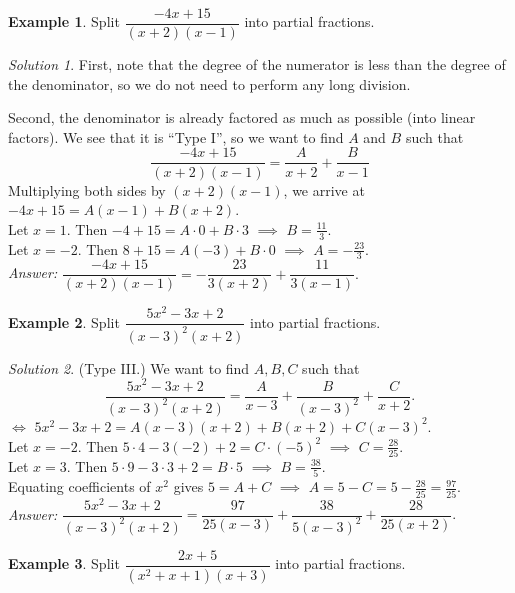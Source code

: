 \documentclass[
  english,
  12pt,
  oneside]{book}
\theoremstyle{definition}
\theoremstyle{definition}
\newtheorem{example}{Example}[chapter]
\theoremstyle{definition}
\theoremstyle{definition}
\theoremstyle{remark}
\newtheorem*{solution}{Solution}
\begin{document}
\begin{example}
Split \(\dfrac{-4x+15}{(x+2)(x-1)}\) into partial fractions.
\end{example}

\begin{solution}
First, note that the degree of the numerator is less than the degree of the denominator, so we do not need to perform any long division.

Second, the denominator is already factored as much as possible (into linear factors). We see that it is ``Type I'', so we want to find \(A\) and \(B\) such that
\[\frac{-4x+15}{(x+2)(x-1)} = \frac{A}{x+2}+\frac{B}{x-1}\]
Multiplying both sides by \((x+2)(x-1)\), we arrive at\\
\(-4x+15 = A(x-1)+B(x+2)\).\\
Let \(x=1\). Then \(-4+15 = A\cdot 0+B\cdot 3\) \(\implies\) \(B=\frac{11}{3}\).\\
Let \(x=-2\). Then \(8+15=A(-3)+B\cdot 0\) \(\implies\) \(A=-\frac{23}{3}\).\\
\emph{Answer:}
\(\dfrac{-4x+15}{(x+2)(x-1)} = -\dfrac{23}{3(x+2)}+\dfrac{11}{3(x-1)}.\)
\end{solution}

\begin{example}
Split \(\dfrac{5x^2-3x+2}{(x-3)^2(x+2)}\) into partial fractions.
\end{example}

\begin{solution}
(Type III.) We want to find \(A,B,C\) such that
\[\frac{5x^2-3x+2}{(x-3)^2(x+2)}=\frac{A}{x-3}+\frac{B}{(x-3)^2}+\frac{C}{x+2}.\]
\(\iff\) \(5x^2-3x+2 = A(x-3)(x+2)+B(x+2)+C(x-3)^2\).\\
Let \(x=-2\). Then \(5\cdot 4-3(-2)+2 = C\cdot(-5)^2\) \(\implies\) \(C=\frac{28}{25}\).\\
Let \(x=3\). Then \(5\cdot 9-3\cdot 3+2 = B\cdot 5\) \(\implies\) \(B=\frac{38}{5}\).\\
Equating coefficients of \(x^2\) gives \(5=A+C\) \(\implies\) \(A=5-C=5-\frac{28}{25}=\frac{97}{25}\).\\
\emph{Answer:}
\(\dfrac{5x^2-3x+2}{(x-3)^2(x+2)}=\dfrac{97}{25(x-3)}+\dfrac{38}{5(x-3)^2}+\dfrac{28}{25(x+2)}.\)
\end{solution}

\begin{example}
Split \(\dfrac{2x+5}{(x^2+x+1)(x+3)}\) into partial fractions.
\end{example}
\end{document}
